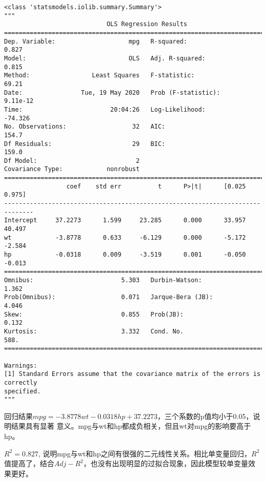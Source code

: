 \documentclass[11pt]{article}
\makeatletter
\newcommand{\boxspacing}{\kern\kvtcb@left@rule\kern\kvtcb@boxsep}
\newcommand{\prompt}[4]{
        \ttfamily\llap{{\color{#2}[#3]:\hspace{3pt}#4}}\vspace{-\baselineskip}
    }
\makeatother
\begin{document}
            \begin{tcolorbox}[breakable, size=fbox, boxrule=.5pt, pad at break*=1mm, opacityfill=0]
\prompt{Out}{outcolor}{28}{\boxspacing}
\begin{Verbatim}[commandchars=\\\{\}]
<class 'statsmodels.iolib.summary.Summary'>
"""
                            OLS Regression Results
==============================================================================
Dep. Variable:                    mpg   R-squared:                       0.827
Model:                            OLS   Adj. R-squared:                  0.815
Method:                 Least Squares   F-statistic:                     69.21
Date:                Tue, 19 May 2020   Prob (F-statistic):           9.11e-12
Time:                        20:04:26   Log-Likelihood:                -74.326
No. Observations:                  32   AIC:                             154.7
Df Residuals:                      29   BIC:                             159.0
Df Model:                           2
Covariance Type:            nonrobust
==============================================================================
                 coef    std err          t      P>|t|      [0.025      0.975]
------------------------------------------------------------------------------
Intercept     37.2273      1.599     23.285      0.000      33.957      40.497
wt            -3.8778      0.633     -6.129      0.000      -5.172      -2.584
hp            -0.0318      0.009     -3.519      0.001      -0.050      -0.013
==============================================================================
Omnibus:                        5.303   Durbin-Watson:                   1.362
Prob(Omnibus):                  0.071   Jarque-Bera (JB):                4.046
Skew:                           0.855   Prob(JB):                        0.132
Kurtosis:                       3.332   Cond. No.                         588.
==============================================================================

Warnings:
[1] Standard Errors assume that the covariance matrix of the errors is correctly
specified.
"""
\end{Verbatim}
\end{tcolorbox}
        
    回归结果\(mpg=-3.8778wt-0.0318hp+37.2273\)，三个系数的p值均小于0.05，说明结果具有显著
    意义。mpg与wt和hp都成负相关，但且wt对mpg的影响要高于hp。
    
    \(R^2=0.827\), 说明mpg与wt和hp之间有很强的二元线性关系。相比单变量回归，\(R^2\)值提高了，结合\(Adj-R^2\)，也没有出现明显的过拟合现象，因此模型较单变量效果更好。
\end{document}
